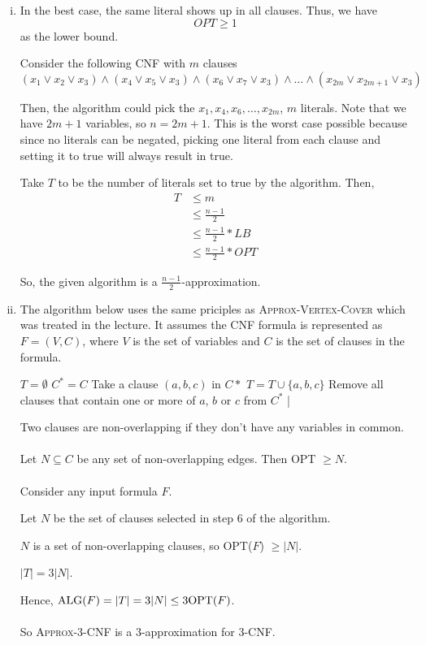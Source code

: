 \begin{enumerate}[(i)]
	\item In the best case, the same literal shows up in all clauses.
		Thus, we have
		\[
		OPT \geq 1
		\]
		as the lower bound.

		Consider the following CNF with $m$ clauses
		\[
			(x_1 \lor x_2 \lor x_3) \land (x_4 \lor x_5 \lor x_3) \land (x_6 \lor x_7 \lor x_3) \land \ldots \land (x_{2m} \lor x_{2m+1} \lor x_3)
		\]

		Then, the algorithm could pick the $x_1, x_4, x_6, \ldots, x_{2m}$, $m$ literals.
		Note that we have $2m + 1$ variables, so $n = 2m + 1$.
		This is the worst case possible because since no literals can be negated, picking one literal from each clause and setting it to true will always result in true.

		Take $T$ to be the number of literals set to true by the algorithm.
		Then,
		\begin{equation}
		\begin{split}
			T & \leq m  \\
				& \leq \frac{n-1}{2}\\
				& \leq \frac{n-1}{2} * LB \\
				& \leq \frac{n-1}{2} * OPT
		\end{split}
		\end{equation}

		So, the given algorithm is a $\frac{n-1}{2}$-approximation.
	\item The algorithm below uses the same priciples as \textsc{Approx-Vertex-Cover} which was treated in the lecture.
        It assumes the CNF formula is represented as $F=(V,C)$, where $V$ is the set of variables and $C$ is the set of clauses in the formula.

\begin{sourcecode}
$T = \emptyset$
$C^* = C$
	Take a clause $(a, b, c)$ in $C*$
	$T = T \cup \{a, b, c\}$
	Remove all clauses that contain one or more of $a$, $b$ or $c$ from $C^*$
|
\qend
\end{sourcecode}

		Two clauses are non-overlapping if they don't have any variables in common.\\%
		\\
		Let $N \subseteq C$ be any set of non-overlapping edges. Then OPT $\geq N$.\\
		\\
		Consider any input formula $F$.

		Let $N$ be the set of clauses selected in step 6 of the algorithm.

		$N$ is a set of non-overlapping clauses, so OPT($F$) $\geq |N|$.

		$|T| = 3|N|$.

		Hence, $\textnormal{ALG}(F) = |T| = 3|N| \leq 3 \textnormal{OPT}(F)$.\\
		\\
		So \textsc{Approx-3-CNF} is a 3-approximation for 3-CNF.
\end{enumerate}
